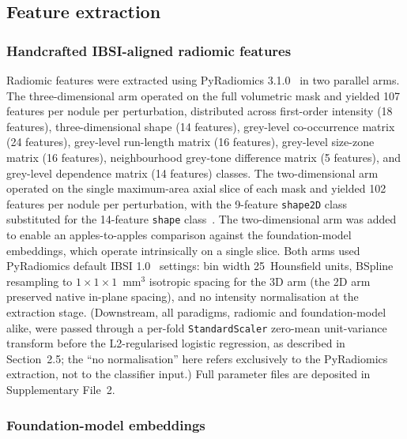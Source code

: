 \subsection{Feature extraction}

\subsubsection{Handcrafted IBSI-aligned radiomic features}

Radiomic features were extracted using PyRadiomics 3.1.0~\cite{vangriethuysen2017} in two parallel arms. The three-dimensional arm operated on the full volumetric mask and yielded 107 features per nodule per perturbation, distributed across first-order intensity (18 features), three-dimensional shape (14 features), grey-level co-occurrence matrix (24 features), grey-level run-length matrix (16 features), grey-level size-zone matrix (16 features), neighbourhood grey-tone difference matrix (5 features), and grey-level dependence matrix (14 features) classes. The two-dimensional arm operated on the single maximum-area axial slice of each mask and yielded 102 features per nodule per perturbation, with the 9-feature \texttt{shape2D} class substituted for the 14-feature \texttt{shape} class~\cite{vangriethuysen2017}. The two-dimensional arm was added to enable an apples-to-apples comparison against the foundation-model embeddings, which operate intrinsically on a single slice. Both arms used PyRadiomics default IBSI 1.0~\cite{zwanenburg2020} settings: bin width 25~Hounsfield units, BSpline resampling to $1 \times 1 \times 1$~mm$^3$ isotropic spacing for the 3D arm (the 2D arm preserved native in-plane spacing), and no intensity normalisation at the extraction stage. (Downstream, all paradigms, radiomic and foundation-model alike, were passed through a per-fold \texttt{StandardScaler} zero-mean unit-variance transform before the L2-regularised logistic regression, as described in Section~2.5; the ``no normalisation'' here refers exclusively to the PyRadiomics extraction, not to the classifier input.) Full parameter files are deposited in Supplementary File~2.

\subsubsection{Foundation-model embeddings}

